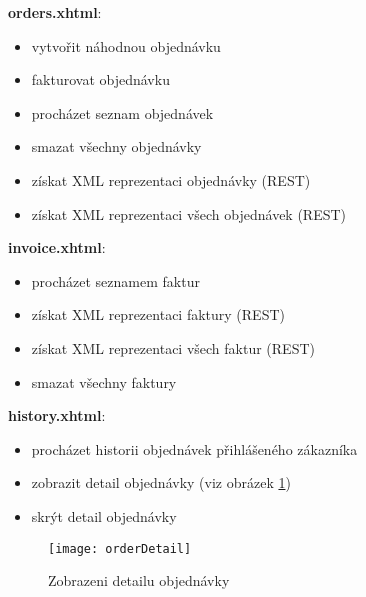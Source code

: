 \documentclass[122pt,oneside]{fithesis}
\begin{document}
{\bf orders.xhtml}:
\begin{itemize}  \itemsep0em
  \item vytvořit náhodnou objednávku
  \item fakturovat objednávku
  \item procházet seznam objednávek
  \item smazat všechny objednávky
  \item získat XML reprezentaci objednávky (REST)
  \item získat XML reprezentaci všech objednávek (REST)
\end{itemize}
{\bf invoice.xhtml}:
\begin{itemize}  \itemsep0em
  \item procházet seznamem faktur
  \item získat XML reprezentaci faktury (REST)
  \item získat XML reprezentaci všech faktur (REST)
  \item smazat všechny faktury
\end{itemize}
{\bf history.xhtml}:
\begin{itemize}  \itemsep0em
  \item procházet historii objednávek přihlášeného zákazníka 
  \item zobrazit detail objednávky (viz obrázek \ref{img:orderDetail})
  \item skrýt detail objednávky
\end{itemize}

\begin{figure}[!ht]
\centering
\texttt{[image: orderDetail]}
\caption{Zobrazeni detailu objednávky}
\label{img:orderDetail}
\end{figure}


\end{document}
